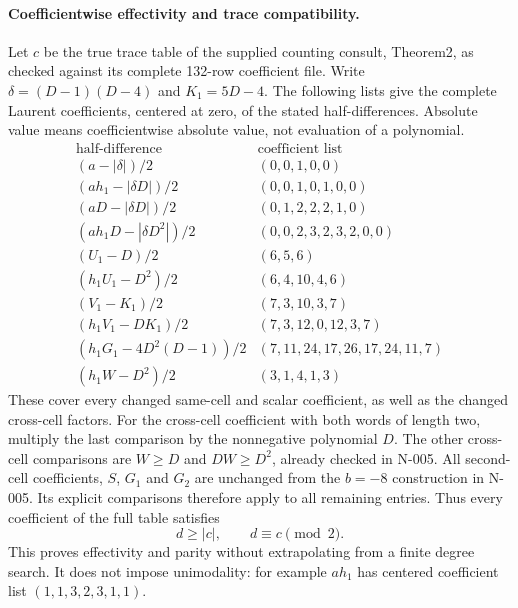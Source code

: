\paragraph{Coefficientwise effectivity and trace compatibility.}
Let $c$ be the true trace table of the supplied counting consult,
Theorem2, as checked against its complete 132-row coefficient file.
Write $\delta=(D-1)(D-4)$ and $K_1=5D-4$.
The following lists give the complete Laurent coefficients, centered
at zero, of the stated half-differences.  Absolute value means
coefficientwise absolute value, not evaluation of a polynomial.
\[
\begin{array}{c|l}
\text{half-difference}&\text{coefficient list}\\\hline
(a-|\delta|)/2&(0,0,1,0,0)\\
(ah_1-|\delta D|)/2&(0,0,1,0,1,0,0)\\
(aD-|\delta D|)/2&(0,1,2,2,2,1,0)\\
(ah_1D-|\delta D^2|)/2&(0,0,2,3,2,3,2,0,0)\\
(U_1-D)/2&(6,5,6)\\
(h_1U_1-D^2)/2&(6,4,10,4,6)\\
(V_1-K_1)/2&(7,3,10,3,7)\\
(h_1V_1-DK_1)/2&(7,3,12,0,12,3,7)\\
(h_1G_1-4D^2(D-1))/2&(7,11,24,17,26,17,24,11,7)\\
(h_1W-D^2)/2&(3,1,4,1,3)
\end{array}\tag{N-132}
\]
These cover every changed same-cell and scalar coefficient, as well
as the changed cross-cell factors.  For the cross-cell coefficient
with both words of length two, multiply the last comparison by the
nonnegative polynomial $D$.  The other cross-cell comparisons are
$W\ge D$ and $DW\ge D^2$, already checked in N-005.
All second-cell coefficients, $S$, $G_1$ and $G_2$ are unchanged from
the $b=-8$ construction in N-005.  Its explicit comparisons therefore
apply to all remaining entries.  Thus every coefficient of the full
table satisfies
\[
                    d\ge |c|,\qquad d\equiv c\pmod2.
                    \tag{N-133}
\]
This proves effectivity and parity without extrapolating from a
finite degree search.  It does not impose unimodality: for example
$ah_1$ has centered coefficient list $(1,1,3,2,3,1,1)$.

